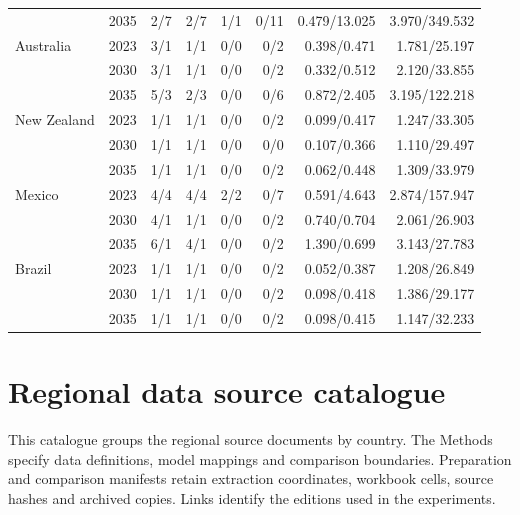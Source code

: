 \documentclass[pdflatex,sn-nature]{sn-jnl}
\begin{document}
\begin{appendices}
\begin{tableorg}[htbp]
{\begin{tabular*}{170mm}{@{\extracolsep{\fill}}lrrrrrrr@{}}
 & 2035 & 2/7 & 2/7 & 1/1 & 0/11 & 0.479/13.025 & 3.970/349.532\\
\addlinespace[3pt]
Australia & 2023 & 3/1 & 1/1 & 0/0 & 0/2 & 0.398/0.471 & 1.781/25.197\\
 & 2030 & 3/1 & 1/1 & 0/0 & 0/2 & 0.332/0.512 & 2.120/33.855\\
 & 2035 & 5/3 & 2/3 & 0/0 & 0/6 & 0.872/2.405 & 3.195/122.218\\
\addlinespace[3pt]
New Zealand & 2023 & 1/1 & 1/1 & 0/0 & 0/2 & 0.099/0.417 & 1.247/33.305\\
 & 2030 & 1/1 & 1/1 & 0/0 & 0/0 & 0.107/0.366 & 1.110/29.497\\
 & 2035 & 1/1 & 1/1 & 0/0 & 0/2 & 0.062/0.448 & 1.309/33.979\\
\addlinespace[3pt]
Mexico & 2023 & 4/4 & 4/4 & 2/2 & 0/7 & 0.591/4.643 & 2.874/157.947\\
 & 2030 & 4/1 & 1/1 & 0/0 & 0/2 & 0.740/0.704 & 2.061/26.903\\
 & 2035 & 6/1 & 4/1 & 0/0 & 0/2 & 1.390/0.699 & 3.143/27.783\\
\addlinespace[3pt]
Brazil & 2023 & 1/1 & 1/1 & 0/0 & 0/2 & 0.052/0.387 & 1.208/26.849\\
 & 2030 & 1/1 & 1/1 & 0/0 & 0/2 & 0.098/0.418 & 1.386/29.177\\
 & 2035 & 1/1 & 1/1 & 0/0 & 0/2 & 0.098/0.415 & 1.147/32.233\\
\bottomrule
\end{tabular*}}
\end{tableorg}

\clearpage
\section{Regional data source catalogue}\label{app:regional-sources}
\setcounter{figure}{0}
This catalogue groups the regional source documents by country. The Methods specify data definitions, model mappings and comparison boundaries. Preparation and comparison manifests retain extraction coordinates, workbook cells, source hashes and archived copies. Links identify the editions used in the experiments.


\end{appendices}
\end{document}
